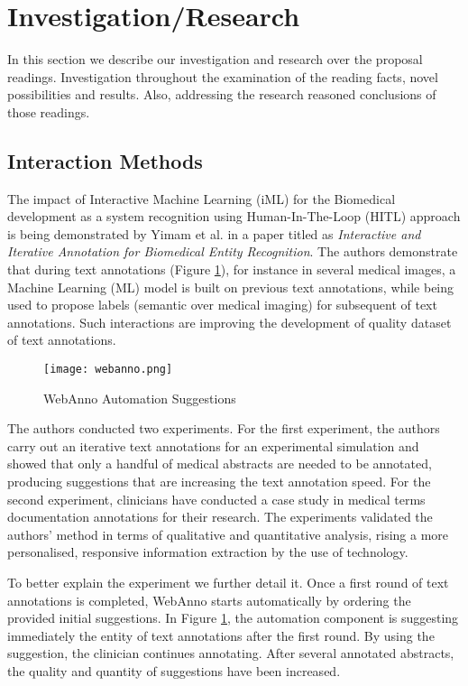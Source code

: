 \section{Investigation/Research}

In this section we describe our investigation and research over the proposal readings. Investigation throughout the examination of the reading facts, novel possibilities and results. Also, addressing the research reasoned conclusions of those readings.

\subsection{Interaction Methods}

The impact of Interactive Machine Learning (iML) for the Biomedical development as a system recognition using Human-In-The-Loop (HITL) approach is being demonstrated by Yimam et al. \cite{yimam2015interactive} in a paper titled as \textit{Interactive and Iterative Annotation for Biomedical Entity Recognition}. The authors demonstrate that during text annotations (Figure \ref{fig:webanno}), for instance in several medical images, a Machine Learning (ML) model is built on previous text annotations, while being used to propose labels (semantic over medical imaging) for subsequent of text annotations. Such interactions are improving the development of quality dataset of text annotations.

\hfill

\begin{figure}[h]
\center
\texttt{[image: webanno.png]}
\caption{WebAnno Automation Suggestions}
\label{fig:webanno}
\end{figure}

\hfill

\clearpage

The authors conducted two experiments. For the first experiment, the authors carry out an iterative text annotations for an experimental simulation and showed that only a handful of medical abstracts are needed to be annotated, producing suggestions that are increasing the text annotation speed. For the second experiment, clinicians have conducted a case study in medical terms documentation annotations for their research. The experiments validated the authors' method in terms of qualitative and quantitative analysis, rising a more personalised, responsive information extraction by the use of technology.

To better explain the experiment we further detail it. Once a first round of text annotations is completed, WebAnno \cite{yimam2013webanno} starts automatically by ordering the provided initial suggestions. In Figure \ref{fig:webanno}, the automation component is suggesting immediately the entity of text annotations after the first round. By using the suggestion, the clinician continues annotating. After several annotated abstracts, the quality and quantity of suggestions have been increased.

